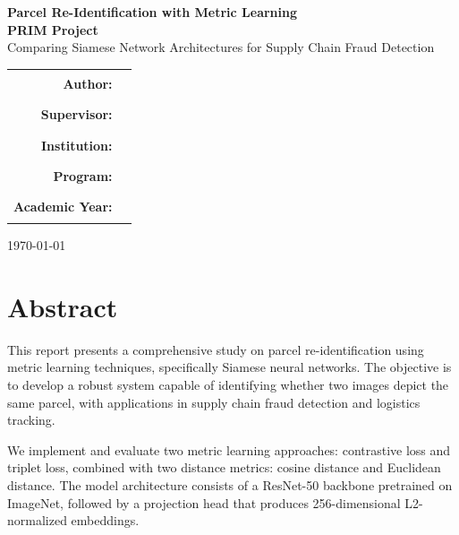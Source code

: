 \documentclass[12pt,a4paper]{article}
\begin{document}
\begin{titlepage}
    \centering
    \vspace*{2cm}
    
    \vspace{2cm}
    
    {\Huge\bfseries Parcel Re-Identification with Metric Learning}\\[0.5cm]
    {\Large\bfseries PRIM Project}\\[1cm]
    
    {\large Comparing Siamese Network Architectures for Supply Chain Fraud Detection}\\[2cm]
    
    \vspace{3cm}
    
    \begin{tabular}{rl}
        \textbf{Author:} & \rule{6cm}{0.4pt} \\[0.5cm]
        \textbf{Supervisor:} & \rule{6cm}{0.4pt} \\[0.5cm]
        \textbf{Institution:} & \rule{6cm}{0.4pt} \\[0.5cm]
        \textbf{Program:} & \rule{6cm}{0.4pt} \\[0.5cm]
        \textbf{Academic Year:} & \rule{6cm}{0.4pt} \\[0.5cm]
    \end{tabular}
    
    \vfill
    
    {\large \today}
    
\end{titlepage}

\newpage
\section*{Abstract}

This report presents a comprehensive study on parcel re-identification using metric learning techniques, specifically Siamese neural networks. The objective is to develop a robust system capable of identifying whether two images depict the same parcel, with applications in supply chain fraud detection and logistics tracking.

We implement and evaluate two metric learning approaches: contrastive loss and triplet loss, combined with two distance metrics: cosine distance and Euclidean distance. The model architecture consists of a ResNet-50 backbone pretrained on ImageNet, followed by a projection head that produces 256-dimensional L2-normalized embeddings.
\end{document}
